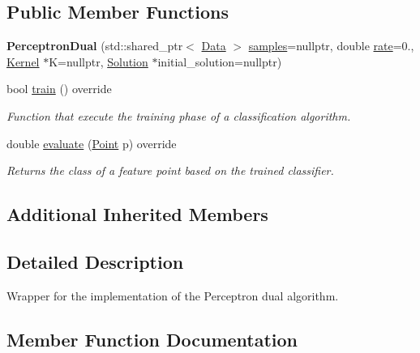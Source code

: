 \subsection*{Public Member Functions}
\begin{DoxyCompactItemize}
\item 
\mbox{\label{class_perceptron_dual_a7f1955774c5758e55232b88c2d8a048a}} 
{\bfseries Perceptron\+Dual} (std\+::shared\+\_\+ptr$<$ \hyperlink{class_data}{Data} $>$ \hyperlink{class_classifier_aad6a4fcea8f44339d7a6302f530852ca}{samples}=nullptr, double \hyperlink{class_classifier_af9867e5919742de1303dd971a9a1c19a}{rate}=0., \hyperlink{class_kernel}{Kernel} $\ast$K=nullptr, \hyperlink{class_solution}{Solution} $\ast$initial\+\_\+solution=nullptr)
\item 
bool \hyperlink{class_perceptron_dual_a67acd9361cba43bbe2d682c4acd4ecaf}{train} () override
\begin{DoxyCompactList}\small\item\em Function that execute the training phase of a classification algorithm. \end{DoxyCompactList}\item 
double \hyperlink{class_perceptron_dual_af45407197f22fd513296f7a80e7683d9}{evaluate} (\hyperlink{class_point}{Point} p) override
\begin{DoxyCompactList}\small\item\em Returns the class of a feature point based on the trained classifier. \end{DoxyCompactList}\end{DoxyCompactItemize}
\subsection*{Additional Inherited Members}


\subsection{Detailed Description}
Wrapper for the implementation of the Perceptron dual algorithm. 

\subsection{Member Function Documentation}
\mbox{\label{class_perceptron_dual_af45407197f22fd513296f7a80e7683d9}} 
